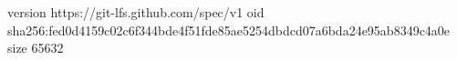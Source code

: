 version https://git-lfs.github.com/spec/v1
oid sha256:fed0d4159c02c6f344bde4f51fde85ae5254dbdcd07a6bda24e95ab8349c4a0e
size 65632
